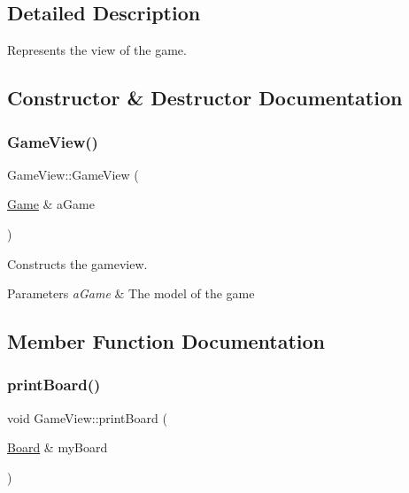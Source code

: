 \subsection{Detailed Description}
Represents the view of the game. 

\subsection{Constructor \& Destructor Documentation}
\mbox{\label{class_game_view_ac7be63c879c9067ebad04fbccea92ecb}} 
\subsubsection{\texorpdfstring{Game\+View()}{GameView()}}
{\footnotesize\ttfamily Game\+View\+::\+Game\+View (\begin{DoxyParamCaption}\item[{\hyperlink{class_game}{Game} \&}]{a\+Game }\end{DoxyParamCaption})}



Constructs the gameview. 


\begin{DoxyParams}{Parameters}
{\em a\+Game} & The model of the game \\
\hline
\end{DoxyParams}


\subsection{Member Function Documentation}
\mbox{\label{class_game_view_a6e01d1ee4e79453ef7dad726e883af7a}} 
\subsubsection{\texorpdfstring{print\+Board()}{printBoard()}}
{\footnotesize\ttfamily void Game\+View\+::print\+Board (\begin{DoxyParamCaption}\item[{\hyperlink{class_board}{Board} \&}]{my\+Board }\end{DoxyParamCaption})}



